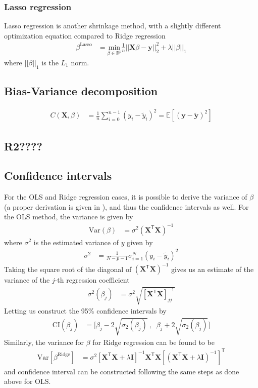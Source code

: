 \documentclass[a4paper]{article}
\newcommand{\XX}{\mathbf{X}}
\newcommand{\II}{\textbf{I}}
\newcommand{\T}{\mathsf{T}}
\begin{document}
\subsubsection{Lasso regression}
Lasso regression is another shrinkage method, with a slightly different optimization equation compared to Ridge regression
\begin{align*}
	\beta^{\text{Lasso}} &= \underset{\beta\in \mathbb{R}^{p}}{\text{min}}\frac{1}{n}||\bm{X}\beta - \bm{y}||^2_2 + \lambda||\beta||_1
\end{align*}
where $||\beta||_1$ is the $L_{1}$ norm.
\subsection{Bias-Variance decomposition}
\begin{align*}
	C(\XX, \beta) &= \frac{1}{n}\sum_{i=0}^{n-1}(y_i-\tilde y_i)^2 = \mathbb{E}[(\bm{y}-\bm{\tilde y})^2]
\end{align*}
\subsection{R2????}
\subsection{Confidence intervals}
For the OLS and Ridge regression cases, it is possible to derive the variance of $\beta$ (a proper derivation is given in \cite{vanwieringen2020lecture}), and thus the confidence intervals as well. For the OLS method, the variance is given by
\begin{align*}
	\text{Var}(\beta) &= \sigma^2(\XX^\T\XX)^{-1}
\end{align*}
where $\sigma^2$ is the estimated variance of $y$ given by %
\begin{align*}
	\sigma^2 &= \frac{1}{N-p-1}\sigma_{i=1}^N(y_i-\tilde y_i)^2
\end{align*}
Taking the square root of the diagonal of $(\XX^\T\XX)^{-1}$ gives us an estimate of the variance of the $j$-th regression coefficient
\begin{align*}
	\sigma^2(\beta_j) &= \sigma^2\sqrt{[\XX^\T\XX]^{-1}_{jj}}
\end{align*}
Letting us construct the 95\% confidence intervals by
\begin{align*}
	\text{CI}(\beta_j) &= \bigg[\beta_j - 2\sqrt{\sigma_2(\beta_j)}\:,\;\; \beta_j + 2\sqrt{\sigma_2(\beta_j)}\bigg]
\end{align*}
Similarly, the variance for $\beta$ for Ridge regression can be found to be
\begin{align*}
\text{Var}[\beta^{\text{Ridge}}] &= \sigma^2[\XX^\T\XX + \lambda\II]^{-1}
\XX^\T \XX[(\XX^\T \XX + \lambda \II)^{-1}]^\T
\end{align*}
and confidence interval can be constructed following the same steps as done above for OLS.%
\end{document}
